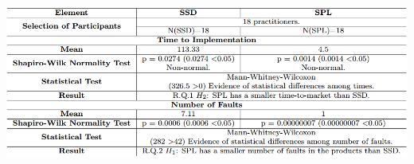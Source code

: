 \begin{table}
\caption{\label{tab:resul_s}SSD and SPL Normality and Statistical Tests Results.}
\centering
\includegraphics[scale=0.35]{figures/section4/MSPLExpSummary.png}


\end{table}
